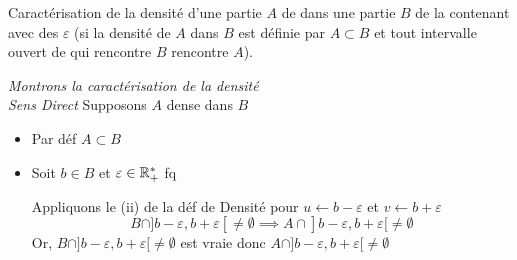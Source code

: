 \documentclass{article}
\begin{document}
	\maketitle

		{Caractérisation de la densité d’une partie $A$ de \R dans une partie $B$ de \R la contenant avec des $\varepsilon$ (si la densité de $A$ dans $B$ est définie par $A \subset B$ et tout intervalle ouvert de \R qui rencontre $B$ rencontre $A$).}

		\textit{Montrons la caractérisation de la densité}\\
		\emph{Sens Direct} Supposons $A$ dense dans $B$
		\begin{itemize}[label=\textemdash]
            \item Par déf $A \subset B$
            \item Soit $b \in B$ et $\varepsilon \in \mathbb R_+^*$ fq

            Appliquons le (ii) de la déf de Densité pour $u \leftarrow b - \varepsilon$ et $v \leftarrow b + \varepsilon$
            $$B \cap ]b - \varepsilon, b + \varepsilon[ \neq \emptyset \implies A \cap ]b - \varepsilon,  b + \varepsilon[ \neq \emptyset$$
            Or, $B \cap ]b - \varepsilon, b + \varepsilon[ \neq \emptyset$ est vraie
            donc $A \cap ]b - \varepsilon,  b + \varepsilon[ \neq \emptyset$


\end{itemize}
\end{question_kholle}
\end{document}
